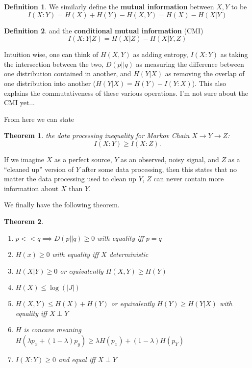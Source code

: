 \documentclass{article}
\newtheorem{theorem}{Theorem}
\theoremstyle{definition}
\newtheorem{definition}{Definition}
\begin{document}
\begin{definition}
We similarly define the \textbf{mutual information} between $X, Y$ to be
\begin{equation}
I(X : Y) = H(X) + H(Y) - H(X, Y) = H(X) - H(X | Y)
\end{equation}
\end{definition}

\begin{definition}
and the \textbf{conditional mutual information} (CMI)
\begin{equation}
I(X : Y | Z) = H(X | Z) - H(X | Y, Z)
\end{equation}
\end{definition}

Intuition wise, one can think of $H(X, Y)$ as adding entropy, $I(X:Y)$ as taking
the intersection between the two, $D(p || q)$ as measuring the difference
between one distribution contained in another, and $H(Y|X)$ as removing the
overlap of one distribution into another ($H(Y | X) = H(Y) - I(Y : X)$). This
also explains the commutativeness of these various operations. I'm not sure
about the CMI yet...

From here we can state

\begin{theorem}
the data processing inequality for Markov Chain $X \to Y \to Z$:
\begin{equation}
I(X : Y) \geq I(X : Z).
\end{equation}
\end{theorem}

If we imagine $X$ as a perfect source, $Y$ as an observed, noisy signal, and $Z$
as a ``cleaned up'' version of $Y$ after some data processing, then this states
that no matter the data processing used to clean up $Y$, $Z$ can never contain
more information about $X$ than $Y$.

We finally have the following theorem.

\begin{theorem}
\begin{enumerate}
\item $p << q \implies D(p || q) \geq 0$ with equality iff $p = q$
\item $H(x) \geq 0$ with equality iff $X$ deterministic
\item $H(X | Y) \geq 0$ or equivalently $H(X, Y) \geq H(Y)$
\item $H(X) \leq \log(|J|)$
\item $H(X, Y) \leq H(X) + H(Y)$ or equivalently $H(Y) \geq H(Y | X)$ with
equality iff $X \perp Y$
\item $H$ is concave meaning $H(\lambda p_x + (1 - \lambda) p_y) \geq
 \lambda H(p_x) + (1 - \lambda) H(p_Y)$
\item $I(X : Y) \geq 0$ and equal iff $X \perp Y$
\end{enumerate}
\end{theorem}
\end{document}
